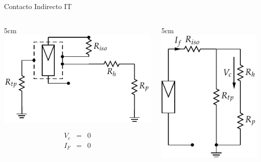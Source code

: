 \documentclass[xcolor={usenames,svgnames,dvipsnames}]{beamer}
\begin{document}
\begin{frame}[label=sec-2-3-3]{Contacto Indirecto IT}
\begin{columns}
\begin{column}{5cm\textwidth}
\includegraphics[width=\textwidth]{../figs/ContactoIndirectoIT.pdf}

$$\begin{aligned}
V_{c} & = & 0\\
I_{F} & = & 0\end{aligned}$$
\end{column}

\begin{column}{5cm\textwidth}
\includegraphics[width=\textwidth]{../figs/ContactoIndirectoIT_simple.pdf}
\end{column}
\end{columns}
\end{frame}
\end{document}
